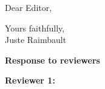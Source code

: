 \documentclass[11pt,a4paper,sans]{moderncv}        %
\begin{document}
\date{\today}
\opening{Dear Editor,}
\closing{Yours faithfully,\\
Juste Raimbault%
}




\justify



\textbf{Response to reviewers}



\bigskip




\bigskip

\textbf{Reviewer 1:}
\end{document}
